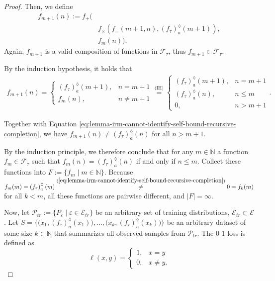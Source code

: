 \begin{proof}
	Then, we define
	\begin{align}
		f_{m+1}(n):=f_{+}\biggl(&\\
		& f_{\times}\left(f_{=}(m+1,n),\left(f_{\tau}\right)_a^{\lozenge}(m+1)\right), \\
		& f_m(n)\biggr).
	\end{align}
	Again, $f_{m+1}$ is a valid composition of functions in $\mathcal{F}_{\tau}$, thus $f_{m+1}\in\mathcal{F}_{\tau}$.
	
	By the induction hypothesis, it holds that
	\begin{align}
		f_{m+1}(n)=\begin{cases}
			\left(f_{\tau}\right)_a^{\lozenge}(m+1), & n=m+1\\
			f_m(n), & n\neq m+1
		\end{cases}\overset{\text{(IH)}}{=} \begin{cases}
			\left(f_{\tau}\right)_a^{\lozenge}(m+1), & n=m+1 \\
			\left(f_{\tau}\right)_a^{\lozenge}(n), & n\leq m\\
			0, & n > m+1
		\end{cases}.
	\end{align}
	
	Together with Equation \ref{eq:lemma-irm-cannot-identify-self-bound-recursive-completion}, we have $f_{m+1}(n)\neq \left(f_{\tau}\right)_a^{\lozenge}(n)$ for all $n>m+1$.
	
	By the induction principle, we therefore conclude that for any $m\in\mathbb{N}$ a function $f_m\in\mathcal{F}_{\tau}$ such that $f_m(n)=\left(f_{\tau}\right)_a^{\lozenge}(n)$ if and only if $n\leq m$.
	Collect these functions into $F:=\{f_m\mid m\in\mathbb{N}\}$.
	Because $f_m(m)=\left(f_{\tau}\right)_a^{\lozenge}(m)\overset{(\ref{eq:lemma-irm-cannot-identify-self-bound-recursive-completion})}{\neq}0=f_k(m)$ for all $k<m$, all these functions are pairwise different, and $|F|=\infty$.
	
	Now, let $\mathcal{P}_{tr}:=\{P_\varepsilon \mid  \varepsilon\in\mathcal{E}_{tr}\}$ be an arbitrary set of training distributions, $\mathcal{E}_{tr}\subset \mathcal{E}$.
	Let $S=\bigl\{\bigl(x_1,\left(f_{\tau}\right)_a^{\lozenge}(x_1)\bigr),\dots,\bigl(x_k,\left(f_{\tau}\right)_a^{\lozenge}(x_k)\bigr)\bigr\}$ be an arbitrary dataset of some size $k\in\mathbb{N}$ that summarizes all observed samples from $\mathcal{P}_{tr}$.
	The 0-1-loss is defined as 
	\begin{equation}
		\label{eq:0-1-loss}
		\ell(x,y)=\begin{cases}
			1, & x=y\\
			0, & x\neq y.
		\end{cases}
	\end{equation}
	

\end{proof}
